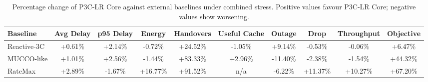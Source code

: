 \begin{table}[!t]
\centering
\caption{Percentage change of P3C-LR Core against external baselines under combined stress. Positive values favour P3C-LR Core; negative values show worsening.}
\label{tab:external_baseline}
\scriptsize
\begin{tabular}{lccccccccc}
\toprule
Baseline & Avg Delay & p95 Delay & Energy & Handovers & Useful Cache & Outage & Drop & Throughput & Objective \\
\midrule
Reactive-3C & +0.61\% & +2.14\% & -0.72\% & +24.52\% & -1.05\% & +9.14\% & -0.53\% & -0.06\% & +6.47\% \\
MUCCO-like & +1.01\% & +2.56\% & -1.44\% & +83.33\% & +2.96\% & -11.40\% & -2.38\% & -1.54\% & +44.32\% \\
RateMax & +2.89\% & -1.67\% & +16.77\% & +91.52\% & n/a & -6.22\% & +11.37\% & +10.27\% & +67.20\% \\
\bottomrule
\end{tabular}
\end{table}
